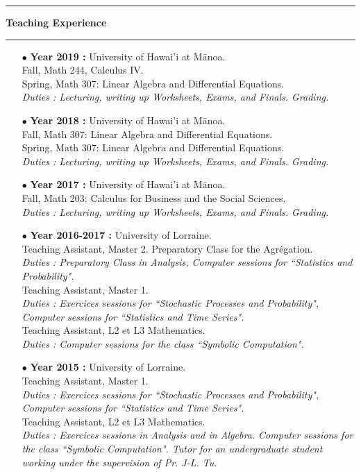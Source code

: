 \documentclass[a4paper,11pt]{article}
\newcommand{\titre}[1]{%
	\begin{center}
	\bigskip
	\rule{\textwidth}{1pt}
	\par\vspace{0.1cm}
        \textbf{\large #1}
	\par\rule{\textwidth}{1pt}
	\end{center}
	\bigskip
	}
\begin{document}
\newpage
\titre{Teaching Experience}
\begin{itemize}

\item[$\bullet$] \textbf{ Year 2019 :} University of Hawai'i at M\={a}noa.\\
					Fall, Math 244, Calculus IV.\\
					Spring, Math 307: Linear Algebra and Differential Equations.\\
					\textit{Duties : Lecturing, writing up Worksheets, Exams, and Finals. Grading.}\\

\item[$\bullet$] \textbf{ Year 2018 :} University of Hawai'i at M\={a}noa.\\
					Fall, Math 307: Linear Algebra and Differential Equations.\\
					Spring, Math 307: Linear Algebra and Differential Equations.\\
					\textit{Duties : Lecturing, writing up Worksheets, Exams, and Finals. Grading.}\\

\item[$\bullet$] \textbf{ Year 2017 :} University of Hawai'i at M\={a}noa.\\
					Fall, Math 203: Calculus for Business and the Social Sciences.\\
					\textit{Duties : Lecturing, writing up Worksheets, Exams, and Finals. Grading.}\\

\item[$\bullet$] \textbf{ Year 2016-2017 :} University of Lorraine.\\
					Teaching Assistant, Master 2. Preparatory Class for the Agrégation.\\
					\textit{Duties : Preparatory Class in Analysis, Computer sessions for ``Statistics and Probability".}\\
					Teaching Assistant, Master 1.\\
					\textit{Duties : Exercices sessions for ``Stochastic Processes and Probability", Computer sessions for ``Statistics and Time Series".}\\
					Teaching Assistant, L2 et L3 Mathematics. \\
					\textit{Duties : Computer sessions for the class ``Symbolic Computation".}\\   
\item[$\bullet$] \textbf{ Year 2015 :} University of Lorraine.\\
					Teaching Assistant, Master 1.\\
					\textit{Duties : Exercices sessions for ``Stochastic Processes and Probability", Computer sessions for ``Statistics and Time Series".}\\
					Teaching Assistant, L2 et L3 Mathematics. \\
					\textit{Duties : Exercices sessions in Analysis and in Algebra. Computer sessions for the class ``Symbolic Computation". Tutor for an undergraduate student working under the supervision of Pr. J-L. Tu.}\\   
					

\end{itemize}
\end{document}
